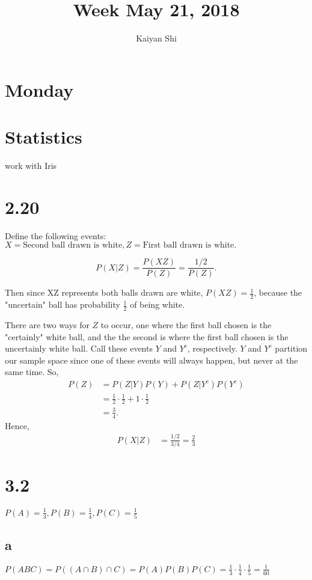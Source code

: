\documentclass{article}
\title{Week May 21, 2018}
\author{Kaiyan Shi}
\begin{document}

\maketitle

\section*{\textcolor{Boogie}{Monday}}
\section*{Statistics} work with Iris
\section*{2.20}
Define the following events:
$X = \text{Second ball drawn is white}, Z = \text{First ball drawn is white}.$ 

$$
P(X|Z) = \frac{P(XZ)}{P(Z)} = \frac{1/2}{P(Z)}.
$$

Then since XZ represents both balls drawn are white, $P(XZ)= \frac{1}{2}$, because the "uncertain" ball has probability $\frac{1}{2}$ of being white.

There are two ways for $Z$ to occur, one where the first ball chosen is the "certainly" white ball, and the the second is where the first ball chosen is the uncertainly white ball. Call these events $Y$ and $Y^c$, respectively. $Y$ and $Y^c$ partition our sample space since one of these events will always happen, but never at the same time. So,
\begin{align*}
    P(Z) &= P(Z|Y)P(Y) + P(Z|Y^c)P(Y^c)\\
    &= \frac{1}{2}\cdot \frac{1}{2} + 1 \cdot \frac{1}{2}\\
    &= \frac{3}{4}.
\end{align*}
Hence,
\begin{align*}
    P(X|Z) &= \frac{1/2}{3/4}=\frac{2}{3}
\end{align*}


\section*{3.2} $P(A)=\frac{1}{3}, P(B) = \frac{1}{4}, P(C) = \frac{1}{5}$
\subsection*{a} $P(ABC) = P((A\cap B) \cap C) = P(A)P(B)P(C) = \frac{1}{3}\cdot \frac{1}{4} \cdot \frac{1}{5} = \frac{1}{60}$
\end{document}
